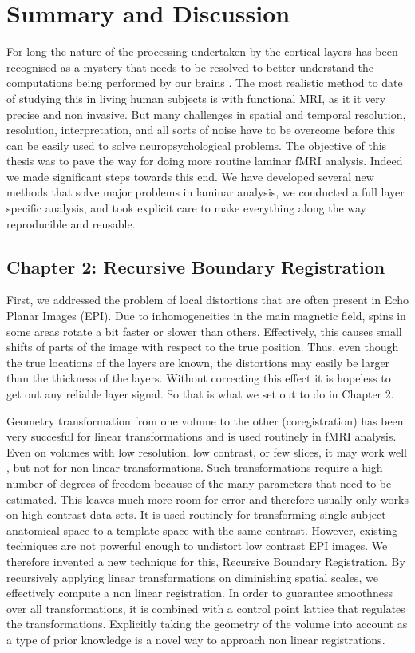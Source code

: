 
\chapter{Summary and Discussion}
\label{ch:discussion}

For long the nature of the processing undertaken by the cortical layers has been recognised as a mystery that needs to be resolved to better understand the computations being performed by our brains \cite{Miller2001}. The most realistic method to date of studying this in living human subjects is with functional MRI, as it it very precise and non invasive. But many challenges in spatial and temporal resolution, resolution, interpretation, and all sorts of noise have to be overcome before this can be easily used to solve neuropsychological problems. The objective of this thesis was to pave the way for doing more routine laminar fMRI analysis. Indeed we made significant steps towards this end. 
We have developed several new methods that solve major problems in laminar analysis, we conducted a full layer specific analysis, and took explicit care to make everything along the way reproducible and reusable. %

\section*{Chapter 2: Recursive Boundary Registration}
First, we addressed the problem of local distortions that are often present in Echo Planar Images (EPI). Due to inhomogeneities in the main magnetic field, spins in some areas rotate a bit faster or slower than others. Effectively, this causes small shifts of parts of the image with respect to the true position. Thus, even though the true locations of the layers are known, the distortions may easily be larger than the thickness of the layers. Without correcting this effect it is hopeless to get out any reliable layer signal. So that is what we set out to do in Chapter 2.

Geometry transformation from one volume to the other (coregistration) has been very succesful for linear transformations and is used routinely in fMRI analysis. Even on volumes with low resolution, low contrast, or few slices, it may work well \cite{Greve201}, but not for non-linear transformations. Such transformations require a high number of degrees of freedom because of the many parameters that need to be estimated. This leaves much more room for error and therefore usually only works on high contrast data sets. It is used routinely for transforming single subject anatomical space to a template space with the same contrast. However, existing techniques are not powerful enough to undistort low contrast EPI images. We therefore invented a new technique for this, Recursive Boundary Registration. By recursively applying linear transformations on diminishing spatial scales, we effectively compute a non linear registration. In order to guarantee smoothness over all transformations, it is combined with a control point lattice that regulates the transformations. Explicitly taking the geometry of the volume into account as a type of prior knowledge is a novel way to approach non linear registrations.

